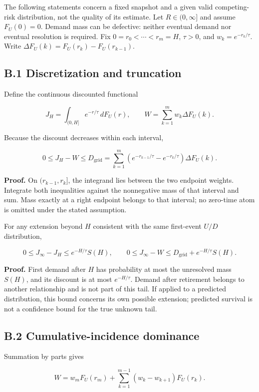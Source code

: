 \documentclass[
  english,
  10pt,
]{article}
\begin{document}
The following statements concern a fixed snapshot and a given valid
competing-risk distribution, not the quality of its estimate. Let
\(R\in(0,\infty]\) and assume \(F_U(0)=0\). Demand mass can be
defective: neither eventual demand nor eventual resolution is required.
Fix \(0=r_0<\cdots<r_m=H\), \(\tau>0\), and \(w_k=e^{-r_k/\tau}\). Write
\(\Delta F_U(k)=F_U(r_k)-F_U(r_{k-1})\).

\subsection{B.1 Discretization and
truncation}\label{b.1-discretization-and-truncation}

Define the continuous discounted functional

\[
J_H=\int_{(0,H]}e^{-r/\tau}\,dF_U(r),
\qquad W=\sum_{k=1}^{m}w_k\Delta F_U(k).
\]

Because the discount decreases within each interval,

\[
0\le J_H-W\le D_{\mathrm{grid}}
=\sum_{k=1}^{m}(e^{-r_{k-1}/\tau}-e^{-r_k/\tau})\Delta F_U(k).
\]

\textbf{Proof.} On \((r_{k-1},r_k]\), the integrand lies between the two
endpoint weights. Integrate both inequalities against the nonnegative
mass of that interval and sum. Mass exactly at a right endpoint belongs
to that interval; no zero-time atom is omitted under the stated
assumption.

For any extension beyond \(H\) consistent with the same first-event
\(U/D\) distribution,

\[
0\le J_\infty-J_H\le e^{-H/\tau}S(H),
\qquad
0\le J_\infty-W\le D_{\mathrm{grid}}+e^{-H/\tau}S(H).
\]

\textbf{Proof.} First demand after \(H\) has probability at most the
unresolved mass \(S(H)\), and its discount is at most \(e^{-H/\tau}\).
Demand after retirement belongs to another relationship and is not part
of this tail. If applied to a predicted distribution, this bound
concerns its own possible extension; predicted survival is not a
confidence bound for the true unknown tail.

\subsection{B.2 Cumulative-incidence
dominance}\label{b.2-cumulative-incidence-dominance}

Summation by parts gives

\[
W=w_mF_U(r_m)+\sum_{k=1}^{m-1}(w_k-w_{k+1})F_U(r_k).
\]
\end{document}
